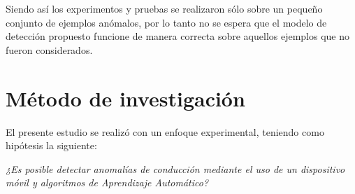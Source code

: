 \vspace{5mm} %

Siendo as\'{i} los experimentos y pruebas se realizaron s\'{o}lo sobre un peque\~{n}o conjunto de ejemplos an\'{o}malos, por lo tanto no se espera que el modelo de detecci\'{o}n propuesto funcione de manera correcta sobre aquellos ejemplos que no fueron considerados.

\section{M\'{e}todo de investigaci\'{o}n}

El presente estudio se realiz\'{o} con un enfoque experimental, teniendo como hip\'{o}tesis la siguiente:


\begin{center}
\textit{\large{¿Es posible detectar anomal\'{i}as de conducci\'{o}n mediante el uso de un dispositivo móvil y algoritmos de Aprendizaje Autom\'{a}tico?}}
\end{center}

